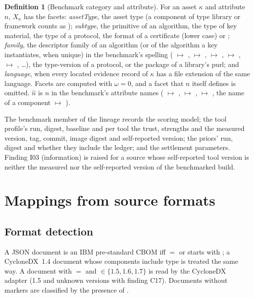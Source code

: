 \documentclass[11pt,a4paper]{article}
\theoremstyle{definition}
\newtheorem{definition}{Definition}[section]
\theoremstyle{plain}
\begin{document}
\begin{definition}[Benchmark category and attribute]\label{def:benchcat}
For an asset $\kappa$ and attribute $n$, $X_\kappa$ has the facets: \emph{assetType}, the asset type
(a component of type library or framework counts as ); \emph{subtype}, the primitive
of an algorithm, the type of key material, the type of a protocol, the format of a certificate
(lower case) or ; \emph{family}, the descriptor family of an algorithm (or of the
algorithm a key instantiates, when unique) in the benchmark's spelling ( $\mapsto$
,  $\mapsto$ ,  $\mapsto$ ,
 $\mapsto$ ,  $\mapsto$ , \ldots), the
type-version of a protocol, or the package of a library's purl; and \emph{language}, when every
located evidence record of $\kappa$ has a file extension of the same language. Facets are computed
with $\omega = 0$, and a facet that $n$ itself defines is omitted. $\hat n$ is $n$ in the benchmark's
attribute names ( $\mapsto$ ,  $\mapsto$
,  $\mapsto$ , the name of a
component $\mapsto$ ).
\end{definition}

The benchmark member of the lineage records the scoring model; the tool profile's run, digest,
baseline and per tool the trust, strengths and the measured version, tag, commit, image digest and
self-reported version; the priors' run, digest and whether they include the ledger; and the
settlement parameters. Finding I03 (information) is raised for a source whose self-reported tool
version is neither the measured nor the self-reported version of the benchmarked build.

\section{Mappings from source formats}\label{sec:mapping}
\subsection{Format detection}
A JSON document is an IBM pre-standard CBOM iff  $=$  or
 starts with ; a CycloneDX~1.4 document whose components
include type  is treated the same way. A document with  $=$
 and  $\in \{1.5, 1.6, 1.7\}$ is read by the CycloneDX
adapter (1.5 and unknown versions with finding C17). Documents without markers are classified by
the presence of .
\end{document}
